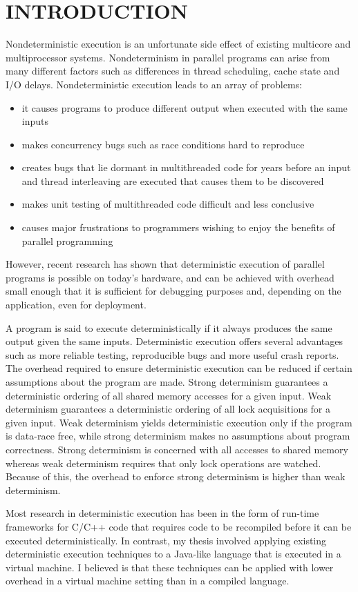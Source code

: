 \chapter{INTRODUCTION}

Nondeterministic execution is an unfortunate side effect of existing
multicore and multiprocessor systems.  Nondeterminism in parallel
programs can arise from many different factors such as differences in
thread scheduling, cache state and I/O delays.  Nondeterministic
execution leads to an array of problems:

\begin{itemize}
\item it causes programs to produce different output when executed
  with the same inputs

\item makes concurrency bugs such as race conditions hard to reproduce

\item creates bugs that lie dormant in multithreaded code for years
  before an input and thread interleaving are executed that causes
  them to be discovered

\item makes unit testing of multithreaded code difficult and less
  conclusive

\item causes major frustrations to programmers wishing to enjoy the
  benefits of parallel programming
\end{itemize}

However, recent research has shown that deterministic execution of
parallel programs is possible on today's hardware, and can be achieved
with overhead small enough that it is sufficient for debugging
purposes and, depending on the application, even for deployment.

A program is said to execute deterministically if it always produces
the same output given the same inputs.  Deterministic execution offers
several advantages such as more reliable testing, reproducible bugs
and more useful crash reports.  The overhead required to ensure
deterministic execution can be reduced if certain assumptions about
the program are made.  Strong determinism guarantees a deterministic
ordering of all shared memory accesses for a given input.  Weak
determinism guarantees a deterministic ordering of all lock
acquisitions for a given input.  Weak determinism yields deterministic
execution only if the program is data-race free, while strong
determinism makes no assumptions about program correctness.  Strong
determinism is concerned with all accesses to shared memory whereas
weak determinism requires that only lock operations are watched.
Because of this, the overhead to enforce strong determinism is higher
than weak determinism.

Most research in deterministic execution has been in the form of
run-time frameworks for C/C++ code that requires code to be recompiled
before it can be executed deterministically.  In contrast, my thesis
involved applying existing deterministic execution techniques to a
Java-like language that is executed in a virtual machine.  I believed
is that these techniques can be applied with lower overhead in a
virtual machine setting than in a compiled language.
